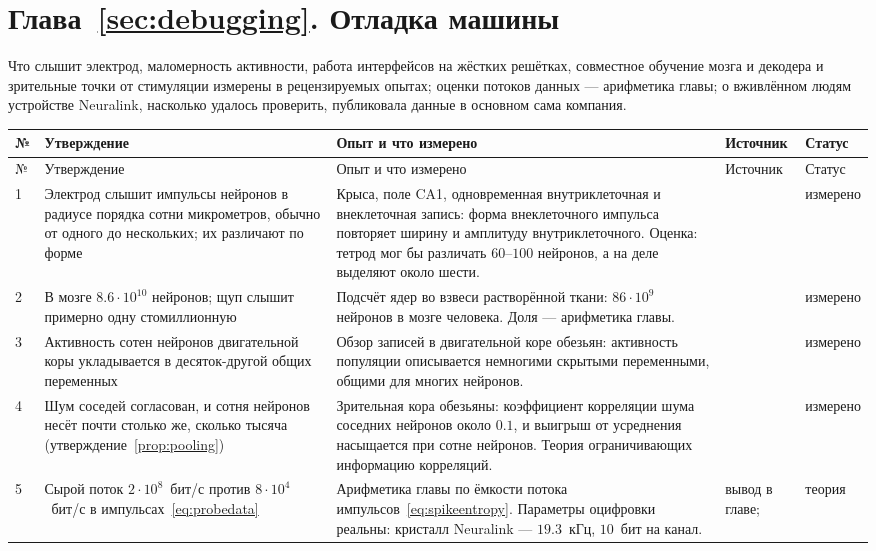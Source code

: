 \section{Глава~\ref{sec:debugging}. Отладка машины}

Что слышит электрод, маломерность активности, работа интерфейсов на жёстких решётках, совместное обучение мозга и декодера и зрительные точки от стимуляции измерены в рецензируемых опытах; оценки потоков данных --- арифметика главы; о вживлённом людям устройстве Neuralink, насколько удалось проверить, публиковала данные в основном сама компания.

{\footnotesize
\setlength{\tabcolsep}{3pt}\renewcommand{\arraystretch}{1.15}
\begin{longtable}{>{\raggedright}p{0.5cm}>{\raggedright}p{4.0cm}>{\raggedright}p{5.6cm}>{\raggedright}p{2.3cm}>{\raggedright\arraybackslash}p{1.7cm}}
\toprule
№ & Утверждение & Опыт и что измерено & Источник & Статус \\
\midrule\endfirsthead
\toprule
№ & Утверждение & Опыт и что измерено & Источник & Статус \\
\midrule\endhead
1 & Электрод слышит импульсы нейронов в радиусе порядка сотни микрометров, обычно от одного до нескольких; их различают по форме & Крыса, поле CA1, одновременная внутриклеточная и внеклеточная запись: форма внеклеточного импульса повторяет ширину и амплитуду внутриклеточного. Оценка: тетрод мог бы различать $60$--$100$ нейронов, а на деле выделяют около шести. & \cite{Henze2000extra} & измерено \\
2 & В мозге $8.6\cdot10^{10}$ нейронов; щуп слышит примерно одну стомиллионную & Подсчёт ядер во взвеси растворённой ткани: $86\cdot10^9$ нейронов в мозге человека. Доля --- арифметика главы. & \cite{Azevedo2009} & измерено \\
3 & Активность сотен нейронов двигательной коры укладывается в десяток-другой общих переменных & Обзор записей в двигательной коре обезьян: активность популяции описывается немногими скрытыми переменными, общими для многих нейронов. & \cite{Gallego2017} & измерено \\
4 & Шум соседей согласован, и сотня нейронов несёт почти столько же, сколько тысяча (утверждение~\ref{prop:pooling}) & Зрительная кора обезьяны: коэффициент корреляции шума соседних нейронов около $0.1$, и выигрыш от усреднения насыщается при сотне нейронов. Теория ограничивающих информацию корреляций. & \cite{Zohary1994, MorenoBote2014} & измерено \\
5 & Сырой поток $2\cdot10^8$~бит/с против $8\cdot10^4$~бит/с в импульсах~\eqref{eq:probedata} & Арифметика главы по ёмкости потока импульсов~\eqref{eq:spikeentropy}. Параметры оцифровки реальны: кристалл Neuralink --- $19.3$~кГц, $10$~бит на канал. & вывод в главе; \cite{Rieke1997, Musk2019} & теория \\

\end{longtable}}
